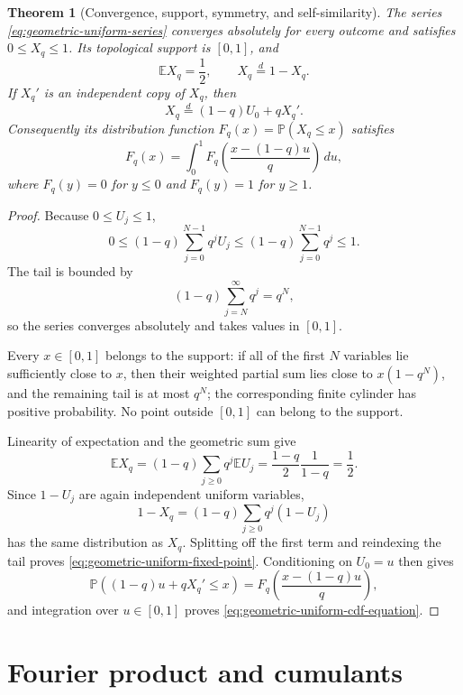 \documentclass[11pt,oneside,openany]{book}
\newtheorem{theorem}{Theorem}[chapter]
\theoremstyle{definition}
\theoremstyle{remark}
\begin{document}
\begin{theorem}[Convergence, support, symmetry, and self-similarity]\label{thm:geometric-uniform-basic}
The series \eqref{eq:geometric-uniform-series} converges absolutely for every outcome and satisfies $0\le X_q\le1$.  Its topological support is $[0,1]$, and
\begin{equation}\label{eq:geometric-uniform-mean-symmetry}
 \mathbb E X_q=\frac12,
 \qquad
 X_q\overset{d}=1-X_q.
\end{equation}
If $X_q'$ is an independent copy of $X_q$, then
\begin{equation}\label{eq:geometric-uniform-fixed-point}
 X_q\overset{d}=(1-q)U_0+qX_q'.
\end{equation}
Consequently its distribution function $F_q(x)=\mathbb P(X_q\le x)$ satisfies
\begin{equation}\label{eq:geometric-uniform-cdf-equation}
 F_q(x)=\int_0^1
 F_q\!\left(\frac{x-(1-q)u}{q}\right)\,du,
\end{equation}
where $F_q(y)=0$ for $y\le0$ and $F_q(y)=1$ for $y\ge1$.
\end{theorem}

\begin{proof}
Because $0\le U_j\le1$,
\[
 0\le (1-q)\sum_{j=0}^{N-1}q^jU_j
 \le(1-q)\sum_{j=0}^{N-1}q^j\le1.
\]
The tail is bounded by
\[
 (1-q)\sum_{j=N}^{\infty}q^j=q^N,
\]
so the series converges absolutely and takes values in $[0,1]$.

Every $x\in[0,1]$ belongs to the support: if all of the first $N$ variables lie sufficiently close to $x$, then their weighted partial sum lies close to $x(1-q^N)$, and the remaining tail is at most $q^N$; the corresponding finite cylinder has positive probability.  No point outside $[0,1]$ can belong to the support.

Linearity of expectation and the geometric sum give
\[
 \mathbb EX_q=(1-q)\sum_{j\ge0}q^j\mathbb EU_j
 =\frac{1-q}{2}\frac1{1-q}=\frac12.
\]
Since $1-U_j$ are again independent uniform variables,
\[
 1-X_q=(1-q)\sum_{j\ge0}q^j(1-U_j)
\]
has the same distribution as $X_q$.  Splitting off the first term and reindexing the tail proves \eqref{eq:geometric-uniform-fixed-point}.  Conditioning on $U_0=u$ then gives
\[
 \mathbb P((1-q)u+qX_q'\le x)
 =F_q\!\left(\frac{x-(1-q)u}{q}\right),
\]
and integration over $u\in[0,1]$ proves \eqref{eq:geometric-uniform-cdf-equation}.
\end{proof}

\section{Fourier product and cumulants}
\end{document}
